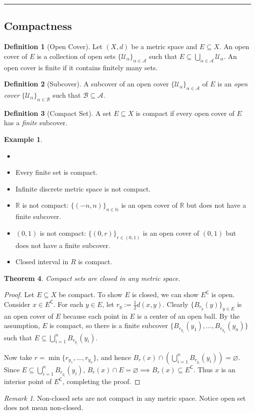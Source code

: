 \documentclass[12pt, lettersize]{article}
\theoremstyle{plain}
\newtheorem{thm}{Theorem}[section]
\theoremstyle{definition}
\newtheorem{dfn}[thm]{Definition}
\newtheorem*{eg}{Example}
\theoremstyle{remark}
\newtheorem*{rem}{Remark}
\newcommand{\R}{\mathbb{R}}
\newcommand{\N}{\mathbb{N}}
\newcommand{\com}{\mathsf{C}}
\let\emptyset\varnothing
\begin{document}
\noindent\rule{\textwidth}{1pt}
\subsection*{Compactness}

\begin{dfn}[Open Cover]
	Let $(X,d)$ be a metric space and $E\subseteq X$. An open cover of $E$ is a collection of open sets $\{\mathcal{U}_\alpha\}_{\alpha\in\mathcal{A}}$ such that $E\subseteq\bigcup_{\alpha\in\mathcal{A}}\mathcal{U}_\alpha$. An open cover is finite if it contains finitely many sets.
\end{dfn}

\begin{dfn}[Subcover]
	A subcover of an open cover $\{\mathcal{U}_\alpha\}_{\alpha\in\mathcal{A}}$ of $E$ is an \emph{open cover} $\{\mathcal{U}_\alpha\}_{\alpha\in\mathcal{B}}$ such that $\mathcal{B}\subseteq\mathcal{A}$.
\end{dfn}

\begin{dfn}[Compact Set]
	A set $E\subseteq X$ is compact if every open cover of $E$ has a \emph{finite} subcover.
\end{dfn}
\begin{eg}
	\begin{itemize}
		\item[]
		\item Every finite set is compact.
		\item Infinite discrete metric space is not compact.
		\item $\R$ is not compact: $\{(-n,n)\}_{n\in\N}$ is an open cover of $\R$ but does not have a finite subcover.
		\item $(0,1)$ is not compact: $\{(0,r)\}_{r\in(0,1)} $ is an open cover of $(0,1)$ but does not have a finite subcover.
		\item Closed interval in $R$ is compact.
	\end{itemize}
\end{eg}

\begin{thm}
	Compact sets are closed in any metric space.
\end{thm}
\begin{proof}
	Let $E\subseteq X$ be compact. To show $E$ is closed, we can show $E^\com$ is open. Consider $x\in E^\com$. For each $y\in E$, let $r_y:=\frac{1}{2}d(x,y)$. Clearly $\{B_{r_y}(y)\}_{y\in E}$ is an open cover of $E$ because each point in $E$ is a center of an open ball. By the assumption, $E$ is compact, so there is a finite subcover $\{B_{r_{y_1}}(y_1),\dots,B_{r_{y_n}}(y_n)\}$ such that $E\subseteq\bigcup_{i=1}^{n}B_{r_{y_i}}(y_i)$. 
	
	Now take $r=\min\{r_{y_1},\dots,r_{y_n}\}$, and hence $B_r(x)\cap(\bigcup_{i=1}^{n}B_{r_{y_i}}(y_i))=\emptyset$. Since $E\subseteq\bigcup_{i=1}^{n}B_{r_{y_i}}(y_i)$, $B_r(x)\cap E=\emptyset\implies B_r(x)\subseteq E^\com$. Thus $x$ is an interior point of $E^\com$, completing the proof.
\end{proof}
\begin{rem}
	Non-closed sets are not compact in any metric space. Notice open set does not mean non-closed.
\end{rem}
\end{document}
